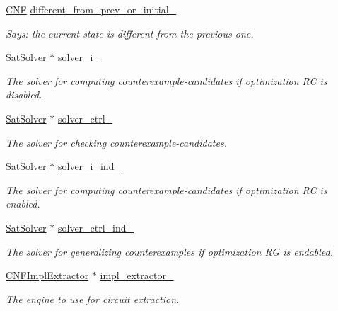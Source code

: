 \begin{DoxyCompactItemize}
\hyperlink{classCNF}{C\-N\-F} \hyperlink{classLearnSynthSAT_a1b0ed51f21b9fbb8cc0954e011968389}{different\-\_\-from\-\_\-prev\-\_\-or\-\_\-initial\-\_\-}
\begin{DoxyCompactList}\small\item\em Says\-: the current state is different from the previous one. \end{DoxyCompactList}\item 
\hyperlink{classSatSolver}{Sat\-Solver} $\ast$ \hyperlink{classLearnSynthSAT_a97e5c03d47cb7f237104472972b12c1c}{solver\-\_\-i\-\_\-}
\begin{DoxyCompactList}\small\item\em The solver for computing counterexample-\/candidates if optimization R\-C is disabled. \end{DoxyCompactList}\item 
\hyperlink{classSatSolver}{Sat\-Solver} $\ast$ \hyperlink{classLearnSynthSAT_abb28d64291205442f1df055049ef0195}{solver\-\_\-ctrl\-\_\-}
\begin{DoxyCompactList}\small\item\em The solver for checking counterexample-\/candidates. \end{DoxyCompactList}\item 
\hyperlink{classSatSolver}{Sat\-Solver} $\ast$ \hyperlink{classLearnSynthSAT_ae7f4a4e3546f46ad1256e203311226cf}{solver\-\_\-i\-\_\-ind\-\_\-}
\begin{DoxyCompactList}\small\item\em The solver for computing counterexample-\/candidates if optimization R\-C is enabled. \end{DoxyCompactList}\item 
\hyperlink{classSatSolver}{Sat\-Solver} $\ast$ \hyperlink{classLearnSynthSAT_ab81d5f53e078238feb1e948a5a5366ff}{solver\-\_\-ctrl\-\_\-ind\-\_\-}
\begin{DoxyCompactList}\small\item\em The solver for generalizing counterexamples if optimization R\-G is endabled. \end{DoxyCompactList}\item 
\hyperlink{classCNFImplExtractor}{C\-N\-F\-Impl\-Extractor} $\ast$ \hyperlink{classLearnSynthSAT_a1c7a39732a4ee3cd1ec877f2642046fc}{impl\-\_\-extractor\-\_\-}
\begin{DoxyCompactList}\small\item\em The engine to use for circuit extraction. \end{DoxyCompactList}\item 

\end{DoxyCompactItemize}
